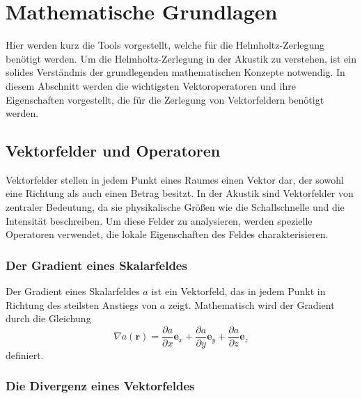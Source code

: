 %
%
%
%
\section{Mathematische Grundlagen
\label{helmholtz:section:Mahtematische_Grundlagen}}

Hier werden kurz die Tools vorgestellt, welche für die Helmholtz-Zerlegung
benötigt werden.
Um die Helmholtz-Zerlegung in der Akustik zu verstehen, ist ein
solides Verständnis der grundlegenden mathematischen Konzepte
notwendig.
In diesem Abschnitt werden die wichtigsten Vektoroperatoren und
ihre Eigenschaften vorgestellt, die für die Zerlegung von Vektorfeldern
benötigt werden.

\subsection{Vektorfelder und Operatoren
\label{helmholtz:subsection:Vektorfelder_Operatoren}}

Vektorfelder stellen in jedem Punkt eines Raumes einen Vektor dar,
der sowohl eine Richtung als auch einen Betrag besitzt.
In der Akustik sind Vektorfelder von zentraler Bedeutung, da sie
physikalische Größen wie die Schallschnelle und die Intensität
beschreiben.
Um diese Felder zu analysieren, werden spezielle Operatoren verwendet,
die lokale Eigenschaften des Feldes charakterisieren.

\subsubsection{Der Gradient eines Skalarfeldes}

Der Gradient eines Skalarfeldes $a$ ist ein Vektorfeld, das in jedem
Punkt in Richtung des steilsten Anstiegs von $a$ zeigt.
Mathematisch wird der Gradient durch die Gleichung
\begin{equation}
\nabla a (\boldsymbol{r})
=
\frac{\partial a}{\partial x}\boldsymbol{e}_x
+
\frac{\partial a}{\partial y}\boldsymbol{e}_y
+
\frac{\partial a}{\partial z}\boldsymbol{e}_z
\end{equation}
definiert.



\subsubsection{Die Divergenz eines Vektorfeldes}

